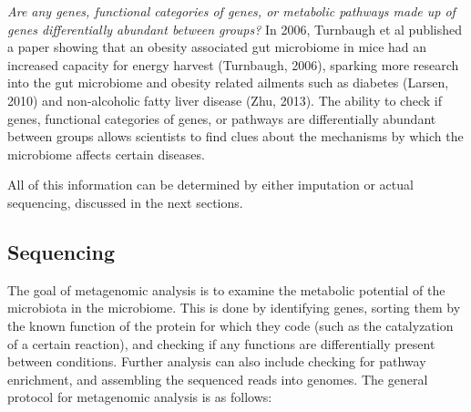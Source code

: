 \textit{Are any genes, functional categories of genes, or metabolic pathways made up of genes differentially abundant between groups?}
In 2006, Turnbaugh et al published a paper showing that an obesity associated gut microbiome in mice had an increased capacity for energy harvest (Turnbaugh, 2006), sparking more research into the gut microbiome and obesity related ailments such as diabetes (Larsen, 2010) and non-alcoholic fatty liver disease (Zhu, 2013). The ability to check if genes, functional categories of genes, or pathways are differentially abundant between groups allows scientists to find clues about the mechanisms by which the microbiome affects certain diseases.

All of this information can be determined by either imputation or actual sequencing, discussed in the next sections.

\subsection{Sequencing}
The goal of metagenomic analysis is to examine the metabolic potential of the microbiota in the microbiome. This is done by identifying genes, sorting them by the known function of the protein for which they code (such as the catalyzation of a certain reaction), and checking if any functions are differentially present between conditions. Further analysis can also include checking for pathway enrichment, and assembling the sequenced reads into genomes. The general protocol for metagenomic analysis is as follows:


